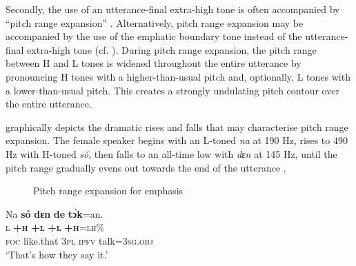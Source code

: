 Secondly, the use of an utterance-final extra-high tone is often accompanied by “pitch range expansion” \citep[276]{Yip2002}. Alternatively, pitch range expansion may be accompanied by the use of the emphatic boundary tone instead of the utterance-final extra-high tone (cf. ). During pitch range expansion, the pitch range between H and L tones is widened throughout the entire utterance by pronouncing H tones with a higher-than-usual pitch and, optionally, L tones with a lower-than-usual pitch. This creates a strongly undulating pitch contour over the entire utterance.

 graphically depicts the dramatic rises and falls that may characterise pitch range expansion. The female speaker begins with an L-toned \textit{na} at 190 Hz, rises to 490 Hz with H-toned \textit{só}, then falls to an all-time low with \textit{dɛn} at 145 Hz, until the pitch range gradually evens out towards the end of the utterance .

\begin{figure}
\caption{Pitch range expansion for emphasis}
\label{fig:key:3.26}
\end{figure}
 


\ea%
    \label{ex:key:65}
    \glll   Na  \textbf{só}    \textbf{dɛn}  \textbf{de}  \textbf{tɔ́k}=an.    \\
\textsc{l}  \textbf{\textsc{+h}}    \textbf{\textsc{+l}}  \textbf{\textsc{+l}}  \textbf{\textsc{+h}}\textsc{=lh\%}      \\
\textsc{foc}  like.that  \textsc{3pl}  \textsc{ipfv}  talk=\textsc{3sg.obj}\\
\glt ‘That’s how they say it.’
\z

